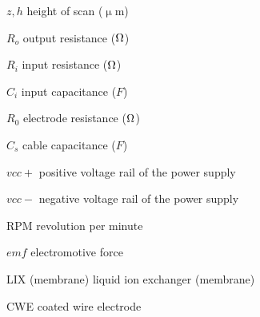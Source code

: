 $z, h$ \dotfill height of scan ($\upmu$m)

$R_o$ \dotfill output resistance ($\ohm$)

$R_i$ \dotfill input resistance ($\ohm$)

$C_i$ \dotfill input capacitance ($F$)

$R_0$ \dotfill electrode resistance ($\ohm$)

$C_s$ \dotfill cable capacitance ($F$)

$vcc+$ \dotfill positive voltage rail of the power supply

$vcc-$ \dotfill negative voltage rail of the power supply

RPM \dotfill revolution per minute

$emf$ \dotfill electromotive force

LIX (membrane) \dotfill liquid ion exchanger (membrane)

CWE \dotfill coated wire electrode
